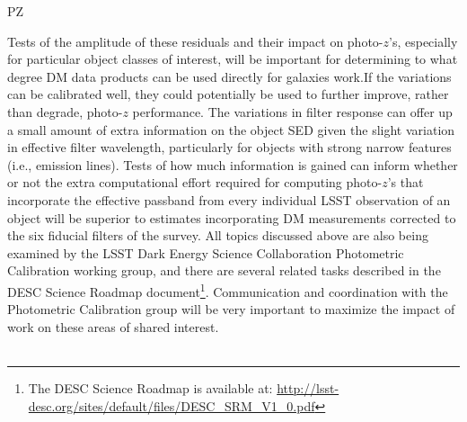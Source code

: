 {\begin{tasklist}{PZ}
\begin{task}
{Tests of the amplitude of these residuals and their impact on photo-$z$'s, especially for particular object classes of interest, will be important for determining to what degree DM data products can be used directly for galaxies work.If the variations can be calibrated well, they could potentially be used to further improve, rather than degrade, photo-$z$ performance.  The variations in filter response can offer up a small amount of extra information on the object SED given the slight variation in effective filter wavelength, particularly for objects with strong narrow features (i.e., emission lines).  Tests of how much information is gained can inform whether or not the extra computational effort required for computing photo-$z$’s that incorporate the effective passband from every individual LSST observation of an object will be superior to estimates incorporating DM measurements corrected to the six fiducial filters of the survey.  All topics discussed above are also being examined by the LSST Dark Energy Science Collaboration Photometric Calibration working group, and there are several related tasks described in the DESC Science Roadmap document\footnote{The DESC Science Roadmap is available at: \url{http://lsst-desc.org/sites/default/files/DESC_SRM_V1_0.pdf}}.  Communication and coordination with the Photometric Calibration group will be very important to maximize the impact of work on these areas of shared interest.
}
~\\
~\\
\end{task}


\end{tasklist}}
